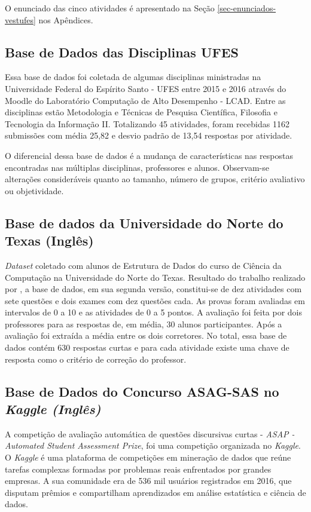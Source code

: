 O enunciado das cinco atividades é apresentado na Seção \ref{sec-enunciados-vestufes} nos Apêndices.

\subsection{Base de Dados das Disciplinas UFES} \label{disciplinas-ufes-db}
Essa base de dados foi coletada de algumas disciplinas ministradas na Universidade Federal do Espírito Santo - UFES entre 2015 e 2016 através do Moodle do Laboratório Computação de Alto Desempenho - LCAD. Entre as disciplinas estão Metodologia e Técnicas de Pesquisa Científica, Filosofia e Tecnologia da Informação II. Totalizando 45 atividades, foram recebidas 1162 submissões com média 25,82 e desvio padrão de 13,54 respostas por atividade.

O diferencial dessa base de dados é a mudança de características nas respostas encontradas nas múltiplas disciplinas, professores e alunos. Observam-se alterações consideráveis quanto ao tamanho, número de grupos, critério avaliativo ou objetividade. 

\subsection{Base de dados da Universidade do Norte do Texas (Inglês)} \label{ds-cc-unt-db}
\textit{Dataset} coletado com alunos de Estrutura de Dados do curso de Ciência da Computação na Universidade do Norte do Texas. Resultado do trabalho realizado por \cite{mohler2011}, a base de dados, em sua segunda versão, constitui-se de dez atividades com sete questões e dois exames com dez questões cada. As provas foram avaliadas em intervalos de 0 a 10 e as atividades de 0 a 5 pontos. A avaliação foi feita por dois professores para as respostas de, em média, 30 alunos participantes. Após a avaliação foi extraída a média entre os dois corretores. No total, essa base de dados contém 630 respostas curtas e para cada atividade existe uma chave de resposta como o critério de correção do professor.

\subsection{Base de Dados do Concurso ASAG-SAS no \it{Kaggle} \bf{(Inglês)}}
\label{kaggle-db}
A competição de avaliação automática de questões discursivas curtas - \textit{ASAP - Automated Student Assessment Prize}, foi uma competição organizada no \textit{Kaggle}. O \textit{Kaggle} é uma plataforma de competições em mineração de dados que reúne tarefas complexas formadas por problemas reais enfrentados por grandes empresas. A sua comunidade era de 536 mil usuários registrados em 2016, que disputam prêmios e compartilham aprendizados em análise estatística e ciência de dados.

